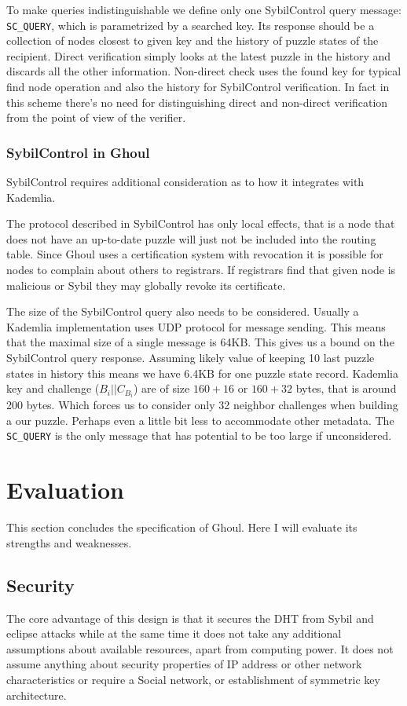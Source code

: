   To make queries indistinguishable we define only one SybilControl query
  message: \texttt{SC\_QUERY}, which is parametrized by a searched key. Its
  response should be a collection of nodes closest to given key and the history
  of puzzle states of the recipient. Direct verification simply looks at the
  latest puzzle in the history and discards all the other information.
  Non-direct check uses the found key for typical find node operation and also
  the history for SybilControl verification. In fact in this scheme there's no
  need for distinguishing direct and non-direct verification from the point of
  view of the verifier.

\subsubsection{SybilControl in Ghoul}
  SybilControl requires additional consideration as to how it integrates with
  Kademlia.

  The protocol described in SybilControl has only local effects, that is a node
  that does not have an up-to-date puzzle will just not be included into the
  routing table. Since Ghoul uses a certification system with revocation it is
  possible for nodes to complain about others to registrars. If registrars find
  that given node is malicious or Sybil they may globally revoke its
  certificate.

  The size of the SybilControl query also needs to be considered. Usually a
  Kademlia implementation uses UDP protocol for message sending. This means that
  the maximal size of a single message is 64KB. This gives us a bound on the
  SybilControl query response. Assuming likely value of keeping 10 last puzzle
  states in history this means we have 6.4KB for one puzzle state record.
  Kademlia key and challenge ($B_i || C_{B_i}$) are of size $160 + 16$ or $160
  + 32$ bytes, that is around 200 bytes. Which forces us to consider only 32
  neighbor challenges when building a our puzzle. Perhaps even a little bit
  less to accommodate other metadata. The \texttt{SC\_QUERY} is the only message
  that has potential to be too large if unconsidered.

\section{Evaluation}
  This section concludes the specification of Ghoul. Here I will evaluate its
  strengths and weaknesses.
  
  \subsection{Security}
  The core advantage of this design is that it secures the DHT from Sybil and
  eclipse attacks while at the same time it does not take any additional
  assumptions about available resources, apart from computing power. It does not
  assume anything about security properties of IP address or other network
  characteristics or require a Social network, or establishment of symmetric key
  architecture.
  
